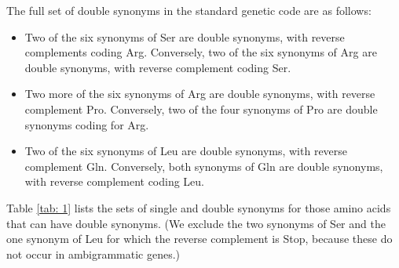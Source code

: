 \documentclass[unnumsec,webpdf,contemporary,large,namedate]{oup-authoring-template}%
\theoremstyle{thmstyleone}%
\theoremstyle{thmstyletwo}%
\theoremstyle{thmstylethree}%
\begin{document}
The full set of double synonyms in the standard genetic code are as follows:

\begin{itemize}

\item Two of the six synonyms of Ser are double synonyms, with reverse complements coding Arg.
Conversely, two of the six synonyms of Arg are double synonyms, with reverse complement coding Ser.

\item Two more of the six synonyms of Arg are double synonyms, with reverse complement Pro.
Conversely, two of the four synonyms of Pro are double synonyms coding for Arg.

\item Two of the six synonyms of Leu are double synonyms, with reverse complement Gln.
Conversely, both synonyms of Gln are double synonyms, with reverse complement coding Leu.

\end{itemize}

Table \ref{tab: 1} lists the sets of single and double synonyms for those amino acids
that can have double synonyms. (We exclude the two synonyms of Ser and the one synonym
of Leu for which the reverse complement is Stop, because these do not occur in ambigrammatic
genes.)
\end{document}
